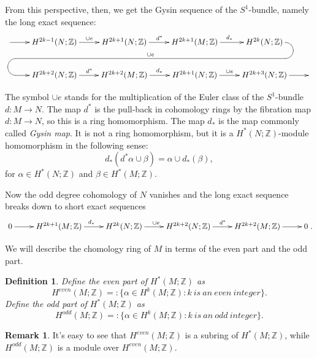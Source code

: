 \documentclass[12pt]{amsart}
\def\Z {{\mathbb{Z}}}
\newtheorem{definition}[theorem]{Definition}
\theoremstyle{definition}
\newtheorem{remark}[theorem]{Remark}
\numberwithin{equation}{section}
\begin{document}
From this perspective, then, we get the Gysin sequence of the
$S^1$-bundle, namely the long exact sequence:
\[
\xymatrix{
   \ar[r]^{} & H^{2k-1}(N;\Z) \ar[r]^{\cup e} & H^{2k+1}(N;\Z) \ar[r]^{d^{*}} & H^{2k+1}(M;\Z) \ar[r]^{d_{*}} &
   H^{2k}(N;\Z)\ar`r[d]`[l] `[lllld]_{\cup e}`[dlll][dlll]
&\\
&H^{2k+2}(N;\Z) \ar[r]^{d^{*}} & H^{2k+2}(M;\Z) \ar[r]^{d_{*}} &
H^{2k+1}(N;\Z) \ar[r]^{\cup e}& H^{2k+3}(N;\Z) \ar[r] & }\]

The symbol $\cup e$ stands for the multiplication of the Euler class
of the $S^1$-bundle $d: M\rightarrow N$. The map $d^{*}$ is the
pull-back in cohomology rings by the fibration map $d: M\rightarrow
N$, so this is a ring homomorphism. The map $d_{*}$ is the map
commonly called {\em Gysin map}. It is not a ring homomorphism, but
it is a $H^{*}(N;\Z)$-module homomorphism in the following sense:
\begin{equation}\label{eq:push-pull}
d_{*}(d^{*}\alpha \cup \beta)= \alpha\cup d_{*}(\beta),
\end{equation}
for $\alpha\in H^{*}(N;\Z)$ and $\beta\in H^{*}(M;\Z)$.

Now the odd degree cohomology of $N$ vanishes and the long exact
sequence breaks down to short exact sequences
\begin{equation}\label{eq:ses}
\xymatrix{
  0 \ar[r]^{} & H^{2k+1}(M;\Z) \ar[r]^{d_{*}} & H^{2k}(N;\Z) \ar[r]^{\cup e} & H^{2k+2}(N;\Z) \ar[r]^{d^{*}} & H^{2k+2}(M;\Z) \ar[r]^{} & 0
  }.
\end{equation}

We will describe the chomology ring of $M$ in terms of the even part
and the odd part.
\begin{definition}\label{def:H_e}
Define the even part of $H^{*}(M;\Z)$ as
\begin{equation}H^{even}(M;\Z)=: \{\alpha\in H^{k}(M;\Z): k \ is\  an\
even\ integer\}.\end{equation}
 Define the odd part of $H^{*}(M;\Z)$ as
\begin{equation}H^{odd}(M;\Z)=: \{\alpha\in H^{k}(M;\Z): k\  is\  an\
odd\ integer\}.\end{equation}
\end{definition}

\begin{remark}\label{rmk:H_e}
It's easy to see that $H^{even}(M;\Z)$ is a subring of
$H^{*}(M;\Z)$, while $H^{odd}(M;\Z)$ is a module over
$H^{even}(M;\Z)$.
\end{remark}
\end{document}
